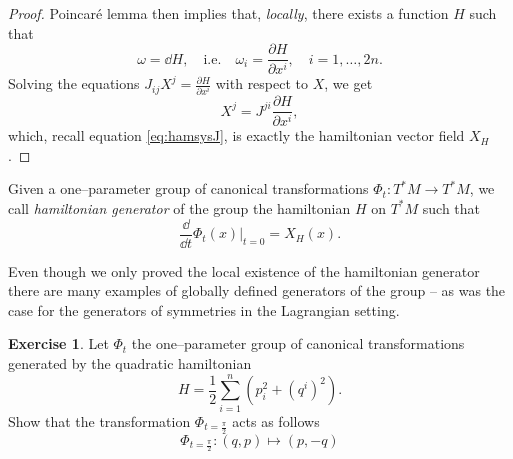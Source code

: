 \documentclass[english,fontsize=11pt,paper=b5]{scrbook}
\theoremstyle{definition}
\newtheorem{exercise}{Exercise}[chapter]
\begin{document}
\begin{proof}
      Poincar\'e lemma \cite{book:lee} then implies that, \emph{locally}, there exists a function $H$ such that
      \begin{equation}
        \omega = \dd H, \quad\mbox{i.e.}\quad \omega_i = \frac{\partial H}{\partial x^i}, \quad i=1,\ldots,2n.
      \end{equation}
      Solving the equations $J_{ij} X^j = \frac{\partial H}{\partial x^i}$ with respect to $X$, we get
      \begin{equation}\label{eq:hamsysJ-1}
        X^j = J^{ji} \frac{\partial H}{\partial x^i},
      \end{equation}
      which, recall equation \eqref{eq:hamsysJ}, is exactly the hamiltonian vector field $X_H$.
    \end{proof}

    \begin{tcolorbox}
      Given a one--parameter group of canonical transformations $\Phi_t:T^*M\to T^*M$, we call \emph{hamiltonian generator} of the group the hamiltonian $H$ on $T^*M$ such that
      \begin{equation}
        \frac{\dd }{\dd t}\Phi_t(x)\Big|_{t=0} = X_H(x).
      \end{equation}
    \end{tcolorbox}

    Even though we only proved the local existence of the hamiltonian generator there are many examples of globally defined generators of the group -- as was the case for the generators of symmetries in the Lagrangian setting.

    \begin{exercise}
      Let $\Phi_t$ the one--parameter group of canonical transformations generated by the quadratic hamiltonian
      \begin{equation}
        H = \frac12 \sum_{i=1}^n\left(p_i^2 + (q^i)^2\right).
      \end{equation}
      Show that the transformation $\Phi_{t=\frac\pi2}$ acts as follows
      \begin{equation}
        \Phi_{t=\frac\pi2} : (q,p) \mapsto (p, -q)
      \end{equation}
    \end{exercise}
\end{document}
